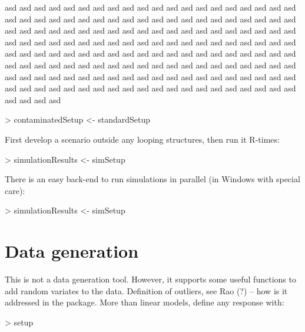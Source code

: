 \documentclass[article]{ajs}
\begin{document}
asd asd asd asd asd asd asd asd asd asd asd asd asd asd asd asd asd asd asd asd asd asd asd asd asd asd asd asd asd asd asd asd asd asd asd asd asd asd asd asd asd asd asd asd asd asd asd asd asd asd asd asd asd asd asd asd asd asd asd asd asd asd asd asd asd asd asd asd asd asd asd asd asd asd asd asd asd asd asd asd asd asd asd asd asd asd asd asd asd asd asd asd asd asd asd asd asd asd asd asd asd asd asd asd asd asd asd asd asd asd asd asd asd asd asd asd asd asd asd asd asd asd asd asd asd asd asd asd asd asd asd asd asd asd asd asd asd asd asd asd asd asd asd asd asd asd asd asd asd asd asd asd asd asd asd asd asd asd asd asd asd asd asd asd 

\begin{Schunk}
\begin{Sinput}
> contaminatedSetup <- standardSetup %
\end{Sinput}
\end{Schunk}

First develop a scenario outside any looping structures, then run it R-times:

\begin{Schunk}
\begin{Sinput}
> simulationResults <- simSetup %
\end{Sinput}
\end{Schunk}

There is an easy back-end to run simulations in parallel (in Windows with special care):

\begin{Schunk}
\begin{Sinput}
> simulationResults <- simSetup %
\end{Sinput}
\end{Schunk}

\section{Data generation}
This is not a data generation tool. However, it supports some useful functions to add random variates to the data. Definition of outliers, see Rao (?) -- how is it addressed in the package. More than linear models, define any response with:
\begin{Schunk}
\begin{Sinput}
> setup %
\end{Sinput}
\end{Schunk}
\end{document}
